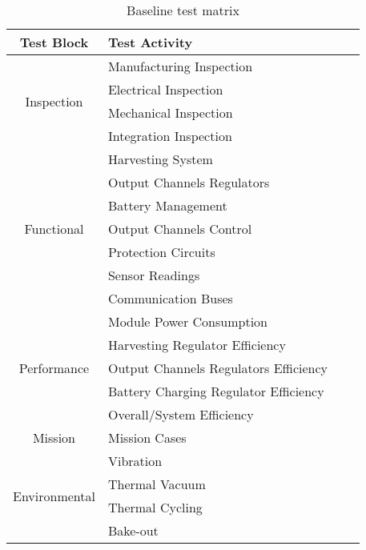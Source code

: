 \begin{table}[htp]
    \centering
    \begin{tabular}{clll}
        \toprule
        \textbf{Test Block} & \textbf{Test Activity} \\
        \midrule
        \midrule
        \multirow{4}{*}{Inspection}     & Manufacturing Inspection              \\
                                        & Electrical Inspection                 \\
                                        & Mechanical Inspection                 \\
                                        & Integration Inspection                \\
        \midrule
        \multirow{7}{*}{Functional}     & Harvesting System                     \\
                                        & Output Channels Regulators            \\
                                        & Battery Management                    \\
                                        & Output Channels Control               \\
                                        & Protection Circuits                   \\
                                        & Sensor Readings                       \\
                                        & Communication Buses                   \\
        \midrule
        \multirow{5}{*}{Performance}    & Module Power Consumption              \\
                                        & Harvesting Regulator Efficiency       \\
                                        & Output Channels Regulators Efficiency \\
                                        & Battery Charging Regulator Efficiency \\
                                        & Overall/System Efficiency             \\
        \midrule
        Mission                         & Mission Cases                         \\
        \midrule
        \multirow{4}{*}{Environmental}  & Vibration                             \\
                                        & Thermal Vacuum                        \\
                                        & Thermal Cycling                       \\
                                        & Bake-out                              \\
        \bottomrule
    \end{tabular}
    \caption{Baseline test matrix}
    \label{tab:baseline-test-matrix}
\end{table}


